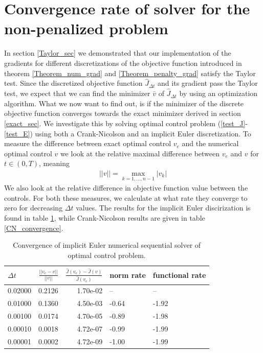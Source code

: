 \section{Convergence rate of solver for the non-penalized problem}
In section \ref{Taylor_sec} we demonstrated that our implementation of the gradients for different discretizations of the objective function introduced in theorem \ref{Theorem_num_grad} and \ref{Theorem_penalty_grad} satisfy the Taylor test. Since the discretized objective function $\hat J_{\Delta t}$ and its gradient pass the Taylor test, we expect that we can find the minimizer $\bar v$ of $\hat J_{\Delta t}$ by using an optimization algorithm. What we now want to find out, is if the minimizer of the discrete objective function converges towards the exact minimizer derived in section \ref{exact_sec}. We investigate this by solving optimal control problem (\ref{test_J}-\ref{test_E}) using both a Crank-Nicolson and an implicit Euler discretization. To measure the difference between exact optimal control $v_e$ and the numerical optimal control $v$ we look at the relative maximal difference between $v_e$ and $v$ for $t\in(0,T)$, meaning
\begin{align}
||v|| = \max_{k=1,...,n-1}|v_k| \label{inner_norm}
\end{align} 
We also look at the relative difference in objective function value between the controls. For both these measures, we calculate at what rate they converge to zero for decreasing $\Delta t$ values. The results for the implicit Euler discirization is found in table \ref{IE_convergence}, while Crank-Nicolson results are given in table \ref{CN_convergence}.
\begin{table}[!h]
\caption{Convergence of implicit Euler numerical sequential solver of optimal control problem.}\label{IE_convergence}
\centering
\begin{tabular}{lrrll}
\toprule
{} $\Delta t$&    $\frac{||v_e-v||}{||v||}$ &  $\frac{\hat J(v_e)-\hat J(v)}{\hat J(v_e)}$ &   norm rate &    functional rate \\
\midrule
0.02000 &  0.2126 &  1.70e-02 &        -- &       -- \\
0.01000 &  0.1360 &  4.50e-03 & -0.64 & -1.92 \\
0.00100 &  0.0174 &  4.70e-05 & -0.89 & -1.98 \\
0.00010 &  0.0018 &  4.72e-07 &   -0.99 & -1.99 \\
0.00001 &  0.0002 &  4.72e-09 &  -1.00 & -1.99 \\
\bottomrule
\end{tabular}
\end{table}
